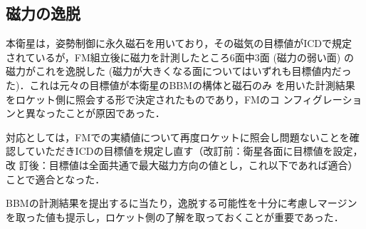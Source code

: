 \subsection{磁力の逸脱}
本衛星は，姿勢制御に永久磁石を用いており，その磁気の目標値がICDで規定
されているが，FM組立後に磁力を計測したところ6面中3面 (磁力の弱い面) の
磁力がこれを逸脱した (磁力が大きくなる面についてはいずれも目標値内だっ
た)．これは元々の目標値が本衛星のBBMの構体と磁石のみ
を用いた計測結果をロケット側に照会する形で決定されたものであり，FMのコ
ンフィグレーションと異なったことが原因であった．

対応としては，FMでの実績値について再度ロケットに照会し問題ないことを確
認していただきICDの目標値を規定し直す（改訂前：衛星各面に目標値を設定，改
  訂後：目標値は全面共通で最大磁力方向の値とし，これ以下であれば適合）ことで適合となった．

BBMの計測結果を提出するに当たり，逸脱する可能性を十分に考慮しマージン
を取った値も提示し，ロケット側の了解を取っておくことが重要であった．


